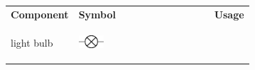         \begin{center}
      
      \label{m38516*uid12}
      
    \noindent
      \tablelasttail{}
      \begin{xtabular*}{\mytablewidth}[t]{|p{10\mystarwidth}|p{10\mystarwidth}|p{10\mystarwidth}|}\hline
    
    
        
                    \textbf{Component}
                   &
    
    
        
                    \textbf{Symbol}
                   &
    
    
        
                    \textbf{Usage}
     \tabularnewline{}
    
    
        light bulb &
    
    
        
                    
    \setcounter{subfigure}{0}

\label{m38516*id62893}
    \begin{center}
    \label{m38516*id62893!!!underscore!!!media}\label{m38516*id62893!!!underscore!!!printimage}\includegraphics[width=0.2\textwidth]{col11305.imgs/m38516_PG10C9_001.png} %
        

\end{center}
\end{xtabular*}
\end{center}
